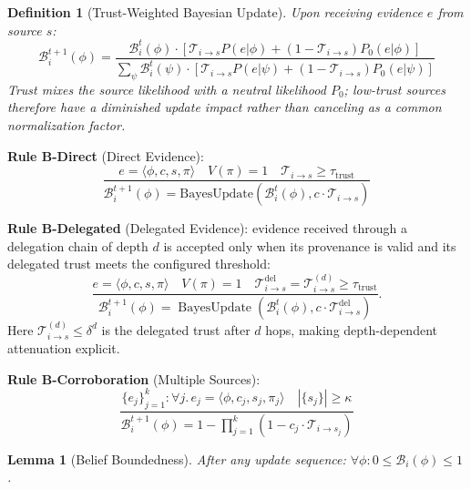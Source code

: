 \documentclass[
]{article}
\newtheorem{definition}{Definition}[section]
\newtheorem{lemma}[theorem]{Lemma}
\begin{document}
\begin{definition}[Trust-Weighted Bayesian Update]
\label{def:bayesian-update}
Upon receiving evidence $e$ from source $s$:
\begin{equation}
\label{eq:bayesian-update}
\mathcal{B}_i^{t+1}(\phi) = \frac{\mathcal{B}_i^t(\phi) \cdot \left[\mathcal{T}_{i \to s} P(e|\phi) + (1-\mathcal{T}_{i \to s})P_0(e|\phi)\right]}{\sum_{\psi} \mathcal{B}_i^t(\psi) \cdot \left[\mathcal{T}_{i \to s} P(e|\psi) + (1-\mathcal{T}_{i \to s})P_0(e|\psi)\right]}
\end{equation}
Trust mixes the source likelihood with a neutral likelihood $P_0$; low-trust sources therefore have a diminished update impact rather than canceling as a common normalization factor.
\end{definition}

\textbf{Rule B-Direct} (Direct Evidence): \begin{equation}
\label{eq:rule-direct}
\frac{e = \langle \phi, c, s, \pi \rangle \quad V(\pi) = 1 \quad \mathcal{T}_{i \to s} \geq \tau_{\text{trust}}}{\mathcal{B}_i^{t+1}(\phi) = \text{BayesUpdate}(\mathcal{B}_i^t(\phi), c \cdot \mathcal{T}_{i \to s})}
\end{equation}

\textbf{Rule B-Delegated} (Delegated Evidence): evidence received
through a delegation chain of depth \(d\) is accepted only when its
provenance is valid and its delegated trust meets the configured
threshold: \begin{equation}
\label{eq:rule-delegated}
\frac{e = \langle \phi, c, s, \pi \rangle \quad V(\pi) = 1 \quad
\mathcal{T}^{\mathrm{del}}_{i \to s} = \mathcal{T}^{(d)}_{i \to s} \geq \tau_{\text{trust}}}
{\mathcal{B}_i^{t+1}(\phi) = \operatorname{BayesUpdate}
\left(\mathcal{B}_i^t(\phi), c \cdot \mathcal{T}^{\mathrm{del}}_{i \to s}\right)}.
\end{equation} Here \(\mathcal{T}^{(d)}_{i \to s} \leq \delta^d\) is the
delegated trust after \(d\) hops, making depth-dependent attenuation
explicit.

\textbf{Rule B-Corroboration} (Multiple Sources): \begin{equation}
\label{eq:rule-corroboration}
\frac{\{e_j\}_{j=1}^k: \forall j.\, e_j = \langle \phi, c_j, s_j, \pi_j \rangle \quad |\{s_j\}| \geq \kappa}{\mathcal{B}_i^{t+1}(\phi) = 1 - \prod_{j=1}^{k}(1 - c_j \cdot \mathcal{T}_{i \to s_j})}
\end{equation}

\begin{lemma}[Belief Boundedness]
\label{lem:belief-bounded}
After any update sequence: $\forall \phi: 0 \leq \mathcal{B}_i(\phi) \leq 1$.
\end{lemma}
\end{document}
